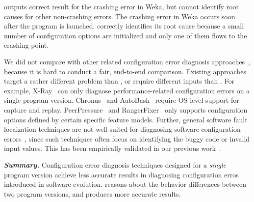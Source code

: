 \conftool outputs correct result for the crashing error in Weka,
but cannot identify root causes for other non-crashing errors.
The crashing error in Weka occurs soon after the program
is launched. \conftool correctly identifies its root cause because
a small number of configuration options
are initialized and only one of them flows to the crashing point.



We did not compare \ourtool with other related
configuration error diagnosis approaches~\cite{Attariyan:2010:ACT,
xray, Whitaker:2004:CDS, Su:2007:AIC, Wang:2004:AMT, rangefix},
because it is hard to conduct a fair, end-to-end comparison.
Existing approaches target a rather
different problem than \ourtool, or require different
inputs than \ourtool. For example, 
X-Ray~\cite{xray} can only diagnose
performance-related configuration errors on a single
program version. Chronus~\cite{Whitaker:2004:CDS}
and AutoBash~\cite{Su:2007:AIC}
require OS-level support for capture and replay.
PeerPressure~\cite{Wang:2004:AMT} and RangerFixer~\cite{rangefix} only
supports configuration options defined by certain
specific feature models. 
Further, general software fault locaization techniques
are not well-suited for diagnosing software
configuration errors~\cite{Jones:2002, McCamant:2003}, since such techniques
often focus on identifying the buggy code or
invalid input values. This has been empirically
validated in our previous work~\cite{Zhang:2013:ADS}.


\vspace{1mm}

\noindent \textbf{\textit{Summary.}} Configuration
error diagnosis techniques designed for a \textit{single}
program version achieve less accurate results in
diagnosing configuration erros introduced in software evolution.
\ourtool reasons about the behavior differences between
two program versions, and produces more accurate results.


